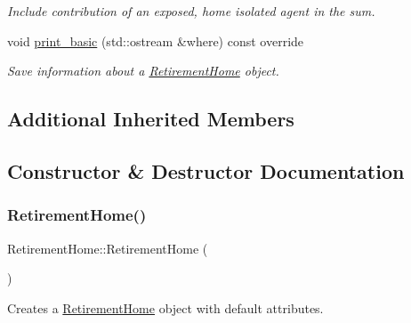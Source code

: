 \begin{DoxyCompactItemize}
\begin{DoxyCompactList}\small\item\em Include contribution of an exposed, home isolated agent in the sum. \end{DoxyCompactList}\item 
void \hyperlink{classRetirementHome_aafab41675600b03fdffcf11db1a07ec7}{print\+\_\+basic} (std\+::ostream \&where) const override
\begin{DoxyCompactList}\small\item\em Save information about a \hyperlink{classRetirementHome}{Retirement\+Home} object. \end{DoxyCompactList}\end{DoxyCompactItemize}
\subsection*{Additional Inherited Members}


\subsection{Constructor \& Destructor Documentation}
\mbox{\label{classRetirementHome_a9161850a079e6f54e129eeceb5fedf37}} 
\subsubsection{\texorpdfstring{Retirement\+Home()}{RetirementHome()}\hspace{0.1cm}{\footnotesize\ttfamily [1/2]}}
{\footnotesize\ttfamily Retirement\+Home\+::\+Retirement\+Home (\begin{DoxyParamCaption}{ }\end{DoxyParamCaption})\hspace{0.3cm}{\ttfamily [default]}}



Creates a \hyperlink{classRetirementHome}{Retirement\+Home} object with default attributes. 

\mbox{\label{classRetirementHome_a31e01ecb1d6a99468939ed75090803ef}} 
